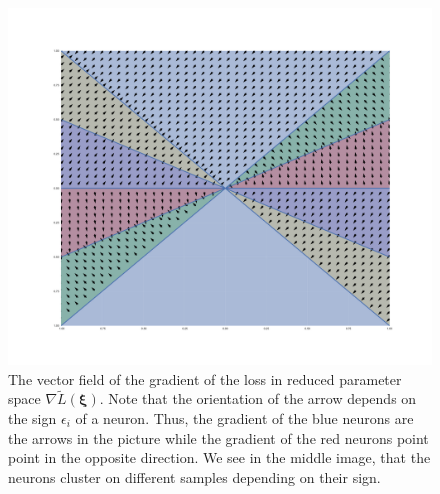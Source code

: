 \begin{figure}
        \includegraphics[width=\linewidth]{figures/reduced_gradient_vector_field.pdf}
    \endminipage\hfill
    \caption{The vector field of the gradient of the loss in reduced parameter space $\nabla \tilde{L}(\bm \xi)$. Note that the orientation of the arrow depends on the sign $\epsilon_i$ of a neuron. Thus, the gradient of the blue neurons are the arrows in the picture while the gradient of the red neurons point point in the opposite direction. We see in the middle image, that the neurons cluster on different samples depending on their sign.}
    \label{fig:reduced_grad}
\end{figure}